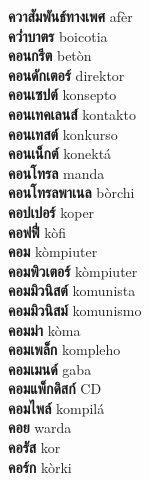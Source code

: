 \textbf{ ควาสัมพันธ์ทางเพศ  } afèr \\
\textbf{ คว่ำบาตร  } boicotia \\
\textbf{ คอนกรีต  } betòn \\
\textbf{ คอนดักเตอร์  } direktor \\
\textbf{ คอนเซปต์  } konsepto \\
\textbf{ คอนเทคเลนส์  } kontakto \\
\textbf{ คอนเทสต์  } konkurso \\
\textbf{ คอนเน็กต์  } konektá \\
\textbf{ คอนโทรล  } manda \\
\textbf{ คอนโทรลพาเนล  } bòrchi \\
\textbf{ คอปเปอร์  } koper \\
\textbf{ คอฟฟี่  } kòfi \\
\textbf{ คอม  } kòmpiuter \\
\textbf{ คอมพิวเตอร์  } kòmpiuter \\
\textbf{ คอมมิวนิสต์  } komunista \\
\textbf{ คอมมิวนิสม์  } komunismo \\
\textbf{ คอมม่า  } kòma \\
\textbf{ คอมเพล็ก  } kompleho \\
\textbf{ คอมเมนด์  } gaba \\
\textbf{ คอมแพ็กดิสก์  } CD \\
\textbf{ คอมไพล์  } kompilá \\
\textbf{ คอย  } warda \\
\textbf{ คอรัส  } kor \\
\textbf{ คอร์ก  } kòrki \\
